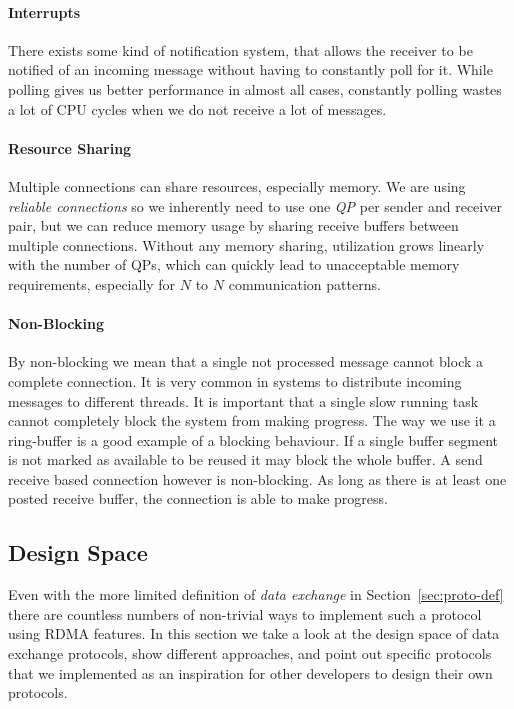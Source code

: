 \paragraph{Interrupts} There exists some kind of notification system, that allows the receiver to be notified 
of an incoming message without having to constantly poll for it. While polling gives us better performance in almost all cases,
constantly polling wastes a lot of CPU cycles when we do not receive a lot of messages.

\paragraph{Resource Sharing} Multiple connections can share resources, especially memory. We are using \emph{reliable connections}
so we inherently need to use one \emph{QP} per sender and receiver pair, but we can reduce memory usage by sharing receive 
buffers between multiple connections. Without any memory sharing, utilization grows linearly with the number of QPs, which 
can quickly lead to unacceptable memory requirements, especially for $N$ to $N$ communication patterns.

\paragraph{Non-Blocking} By non-blocking we mean that a single not processed message cannot block a complete connection. 
It is very common in systems to distribute incoming messages to different threads. It is important that a single slow running 
task cannot completely block the system from making progress. The way we use it a ring-buffer is a good example of a blocking
behaviour. If a single buffer segment is not marked as available to be reused it may block the whole buffer. A send receive 
based connection however is non-blocking. As long as there is at least one posted receive buffer, the connection is able to
make progress.




\subsection{Design Space} \label{sec:proto-ds}


Even with the more limited definition of \emph{data exchange} in Section~\ref{sec:proto-def} there are countless numbers
of non-trivial ways to implement such a protocol using RDMA features. In this section we take a look at the design 
space of data exchange protocols, show different approaches, and point out specific protocols that we implemented
as an inspiration for other developers to design their own protocols.


